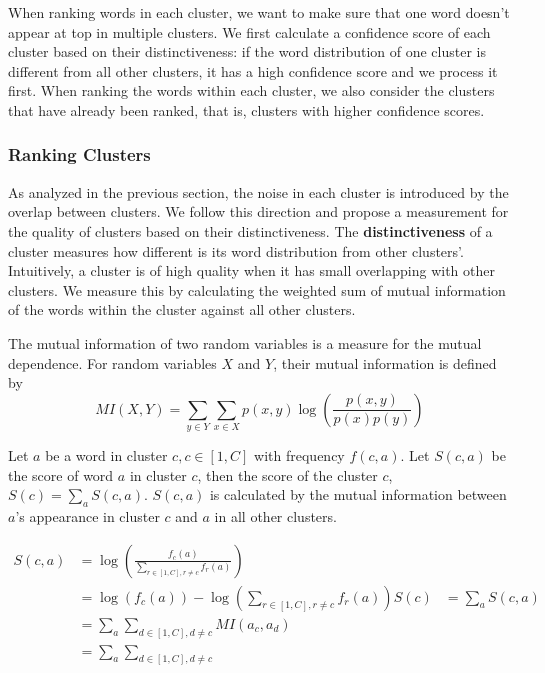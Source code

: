 When ranking words in each cluster, we want to make sure that one word doesn't appear at top in multiple clusters. We first calculate a confidence score of each cluster based on their distinctiveness: if the word distribution of one cluster is different from all other clusters, it has a high confidence score and we process it first. When ranking the words within each cluster, we also consider the clusters that have already been ranked, that is, clusters with higher confidence scores.

\subsubsection{Ranking Clusters}
\label{sec:ranking_clusters}

As analyzed in the previous section, the noise in each cluster is introduced by the overlap between clusters. We follow this direction and propose a measurement for the quality of clusters based on their distinctiveness.
The \textbf{distinctiveness} of a cluster measures how 
different is its word distribution from other clusters'. 
Intuitively, a cluster is of high quality when it has small overlapping 
with other clusters. We measure this by calculating the weighted sum of 
mutual information of the words within the cluster against all other clusters. 

The mutual information of two random variables is a measure for the mutual dependence. For random variables $X$ and $Y$, their mutual information is defined by 
\begin{equation}
MI(X, Y) = \sum_{y\in Y} \sum_{x\in X} p(x, y) \log\left(\frac{p(x, y)}{p(x)p(y)}\right) \label{eq:mi}
\end{equation}

Let $a$ be a word in cluster $c, c\in[1,C]$ with frequency $f(c, a)$. 
Let $S(c, a)$ be the score of word $a$ in cluster $c$, 
then the score of the cluster $c$, $S(c) = \sum_{a} S(c, a)$. 
$S(c,a)$ is calculated by the mutual information between $a$'s appearance 
in cluster $c$ and $a$ in all other clusters. 

\begin{align*}
	S(c, a) &= \log\left(\frac{f_c(a)}{\sum_{r\in[1, C], r\neq c} f_r(a)}\right) \\
			&= \log(f_c(a)) - \log(\sum_{r\in[1, C], r\neq c} f_r(a))
    S(c) &= \sum_{a} S(c, a) \\
         &= \sum_{a} \sum_{d\in [1, C], d\neq c} MI(a_c, a_d) \\
         &= \sum_{a} \sum_{d\in [1, C], d\neq c} 
\end{align*}

